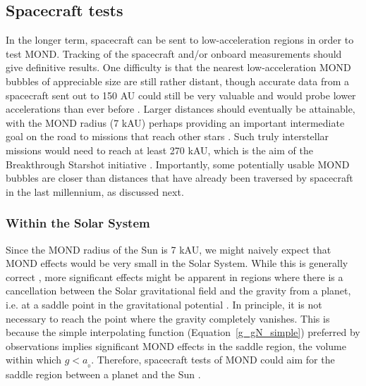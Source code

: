 \documentclass[fleqn,usenatbib,useAMS,onecolumn]{mnras} %
\begin{document}
\subsection{Spacecraft tests}
\label{Spacecraft_tests}

In the longer term, spacecraft can be sent to low-acceleration regions in order to test MOND. Tracking of the spacecraft and/or onboard measurements should give definitive results. One difficulty is that the nearest low-acceleration MOND bubbles of appreciable size are still rather distant, though accurate data from a spacecraft sent out to 150 AU could still be very valuable and would probe lower accelerations than ever before \citep{Berge_2021}. Larger distances should eventually be attainable, with the MOND radius (7 kAU) perhaps providing an important intermediate goal on the road to missions that reach other stars \citep{Heller_2017}. Such truly interstellar missions would need to reach at least 270 kAU, which is the aim of the Breakthrough Starshot initiative \citep{Merali_2016}. Importantly, some potentially usable MOND bubbles are closer than distances that have already been traversed by spacecraft in the last millennium, as discussed next.


\subsubsection{Within the Solar System}
\label{Spacecraft_tests_within_Solar_System}

Since the MOND radius of the Sun is 7 kAU, we might naively expect that MOND effects would be very small in the Solar System. While this is generally correct \citep{Hees_2014, Hees_2016}, more significant effects might be apparent in regions where there is a cancellation between the Solar gravitational field and the gravity from a planet, i.e. at a saddle point in the gravitational potential \citep{Bekenstein_2006}. In principle, it is not necessary to reach the point where the gravity completely vanishes. This is because the simple interpolating function (Equation~\ref{g_gN_simple}) preferred by observations \citep{Iocco_Bertone_2015, Lelli_2017, Banik_2018_Centauri, Chae_2019} implies significant MOND effects in the saddle region, the volume within which $g < a_{_0}$. Therefore, spacecraft tests of MOND could aim for the saddle region between a planet and the Sun \citep[for a review, see][]{Penner_2020}.
\end{document}
